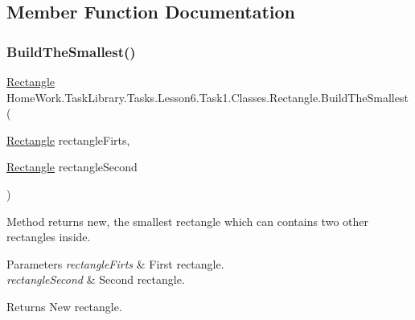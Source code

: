 \subsection{Member Function Documentation}
\mbox{\label{class_home_work_1_1_task_library_1_1_tasks_1_1_lesson6_1_1_task1_1_1_classes_1_1_rectangle_a8729686f31d0d3d129c02a0128cbe00f}} 
\subsubsection{\texorpdfstring{BuildTheSmallest()}{BuildTheSmallest()}}
{\footnotesize\ttfamily \mbox{\hyperlink{class_home_work_1_1_task_library_1_1_tasks_1_1_lesson6_1_1_task1_1_1_classes_1_1_rectangle}{Rectangle}} Home\+Work.\+Task\+Library.\+Tasks.\+Lesson6.\+Task1.\+Classes.\+Rectangle.\+Build\+The\+Smallest (\begin{DoxyParamCaption}\item[{\mbox{\hyperlink{class_home_work_1_1_task_library_1_1_tasks_1_1_lesson6_1_1_task1_1_1_classes_1_1_rectangle}{Rectangle}}}]{rectangle\+Firts,  }\item[{\mbox{\hyperlink{class_home_work_1_1_task_library_1_1_tasks_1_1_lesson6_1_1_task1_1_1_classes_1_1_rectangle}{Rectangle}}}]{rectangle\+Second }\end{DoxyParamCaption})}



Method returns new, the smallest rectangle which can contains two other rectangles inside. 


\begin{DoxyParams}{Parameters}
{\em rectangle\+Firts} & First rectangle.\\
\hline
{\em rectangle\+Second} & Second rectangle.\\
\hline
\end{DoxyParams}
\begin{DoxyReturn}{Returns}
New rectangle.
\end{DoxyReturn}
\mbox{\label{class_home_work_1_1_task_library_1_1_tasks_1_1_lesson6_1_1_task1_1_1_classes_1_1_rectangle_af46aa60b0bb4d368679566d4ccce881f}} 
